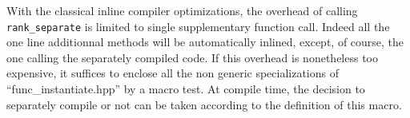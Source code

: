 \documentclass[runningheads,a4paper]{llncs}
\begin{document}
\begin{remark} 
With the classical inline compiler optimizations, the overhead of
calling \texttt{rank\_separate} is limited to single supplementary
function call. Indeed all the one line additionnal methods will be
automatically inlined, except, of course, the one calling the separately
compiled code.
If this overhead is nonetheless too expensive, it suffices to enclose all the non generic specializations of
``func\_instantiate.hpp'' by a macro test. 
At compile time, the decision to separately
compile or not can be taken according to the definition of this
macro. 
\end{remark}




 
\end{document}
